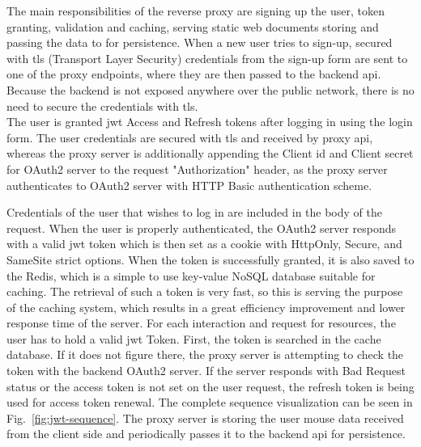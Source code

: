 The main responsibilities of the reverse proxy are signing up the user, token granting, validation and caching, serving static web documents storing and passing the data to for persistence.
When a new user tries to sign-up, secured with \gls{tls} (Transport Layer Security) credentials from the sign-up form are sent to one of the proxy endpoints, where they are then passed to the backend \gls{api}.
Because the backend is not exposed anywhere over the public network, there is no need to secure the credentials with \gls{tls}.\\
The user is granted \gls{jwt} Access and Refresh tokens after logging in using the login form.
The user credentials are secured with \gls{tls} and received by proxy \gls{api}, whereas the proxy server is additionally appending the Client id and Client secret for OAuth2 server to the request "Authorization" header, as the proxy server authenticates to OAuth2 server with HTTP Basic authentication scheme.

Credentials of the user that wishes to log in are included in the body of the request.
When the user is properly authenticated, the OAuth2 server responds with a valid \gls{jwt} token which is then set as a cookie with HttpOnly, Secure, and SameSite strict options.
When the token is successfully granted, it is also saved to the Redis, which is a simple to use key-value NoSQL database suitable for caching.
The retrieval of such a token is very fast, so this is serving the purpose of the caching system, which results in a great efficiency improvement and lower response time of the server.
For each interaction and request for resources, the user has to hold a valid \gls{jwt} Token.
First, the token is searched in the cache database.
If it does not figure there, the proxy server is attempting to check the token with the backend OAuth2 server.
If the server responds with Bad Request status or the access token is not set on the user request, the refresh token is being used for access token renewal.
The complete sequence visualization can be seen in \mbox{Fig.~\ref{fig:jwt-sequence}}.
The proxy server is storing the user mouse data received from the client side and periodically passes it to the backend \gls{api} for persistence.




